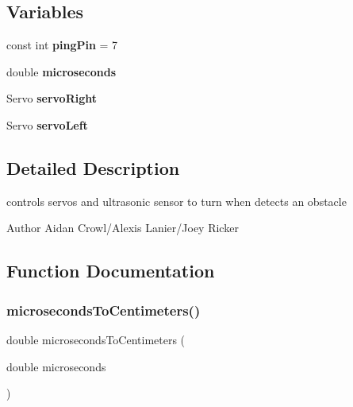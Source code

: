 \subsection*{Variables}
\begin{DoxyCompactItemize}
\item 
\mbox{\label{ObstacleAvoidance_8ino_a0b81f9d6d055cc702b14a125d3543385}} 
const int {\bfseries ping\+Pin} = 7
\item 
\mbox{\label{ObstacleAvoidance_8ino_a0f7be42b48abbeb0064e4ddb76c8f73d}} 
double {\bfseries microseconds}
\item 
\mbox{\label{ObstacleAvoidance_8ino_adbb774c5273f14bafa2a2ecb0f87723f}} 
Servo {\bfseries servo\+Right}
\item 
\mbox{\label{ObstacleAvoidance_8ino_aa9868e91d1d76414c9a127f46e703356}} 
Servo {\bfseries servo\+Left}
\end{DoxyCompactItemize}


\subsection{Detailed Description}
controls servos and ultrasonic sensor to turn when detects an obstacle 

\begin{DoxyAuthor}{Author}
Aidan Crowl/\+Alexis Lanier/\+Joey Ricker 
\end{DoxyAuthor}


\subsection{Function Documentation}
\mbox{\label{ObstacleAvoidance_8ino_ab0174ad16903264a1092448d45512f12}} 
\subsubsection{\texorpdfstring{microseconds\+To\+Centimeters()}{microsecondsToCentimeters()}}
{\footnotesize\ttfamily double microseconds\+To\+Centimeters (\begin{DoxyParamCaption}\item[{double}]{microseconds }\end{DoxyParamCaption})}



